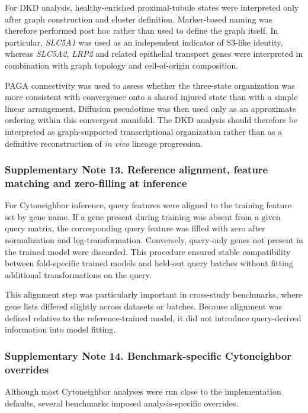 \documentclass[11pt]{article}
\begin{document}
For DKD analysis, healthy-enriched proximal-tubule states were interpreted only after graph construction and cluster definition. Marker-based naming was therefore performed post hoc rather than used to define the graph itself. In particular, \textit{SLC5A1} was used as an independent indicator of S3-like identity, whereas \textit{SLC5A2}, \textit{LRP2} and related epithelial transport genes were interpreted in combination with graph topology and cell-of-origin composition.

PAGA connectivity was used to assess whether the three-state organization was more consistent with convergence onto a shared injured state than with a simple linear arrangement. Diffusion pseudotime was then used only as an approximate ordering within this convergent manifold. The DKD analysis should therefore be interpreted as graph-supported transcriptional organization rather than as a definitive reconstruction of \textit{in vivo} lineage progression.

\subsubsection*{Supplementary Note 13. Reference alignment, feature matching and zero-filling at inference}

For Cytoneighbor inference, query features were aligned to the training feature set by gene name. If a gene present during training was absent from a given query matrix, the corresponding query feature was filled with zero after normalization and log-transformation. Conversely, query-only genes not present in the trained model were discarded. This procedure ensured stable compatibility between fold-specific trained models and held-out query batches without fitting additional transformations on the query.

This alignment step was particularly important in cross-study benchmarks, where gene lists differed slightly across datasets or batches. Because alignment was defined relative to the reference-trained model, it did not introduce query-derived information into model fitting.

\subsubsection*{Supplementary Note 14. Benchmark-specific Cytoneighbor overrides}

Although most Cytoneighbor analyses were run close to the implementation defaults, several benchmarks imposed analysis-specific overrides.
\end{document}
